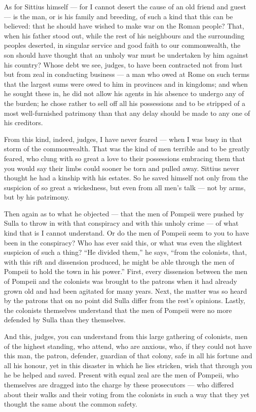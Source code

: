  As for Sittius himself --- for I cannot desert the cause of an old friend and guest --- is the man, or is his family and breeding, of such a kind that this can be believed: that he should have wished to make war on the Roman people? That, when his father stood out, while the rest of his neighbours and the surrounding peoples deserted, in singular service and good faith to our commonwealth, the son should have thought that an unholy war must be undertaken by him against his country? Whose debt we see, judges, to have been contracted not from lust but from zeal in conducting business --- a man who owed at Rome on such terms that the largest sums were owed to him in provinces and in kingdoms; and when he sought these in, he did not allow his agents in his absence to undergo any of the burden; he chose rather to sell off all his possessions and to be stripped of a most well-furnished patrimony than that any delay should be made to any one of his creditors.

 From this kind, indeed, judges, I have never feared --- when I was busy in that storm of the commonwealth. That was the kind of men terrible and to be greatly feared, who clung with so great a love to their possessions embracing them that you would say their limbs could sooner be torn and pulled away. Sittius never thought he had a kinship with his estates. So he saved himself not only from the suspicion of so great a wickedness, but even from all men's talk --- not by arms, but by his patrimony.

 Then again as to what he objected --- that the men of Pompeii were pushed by Sulla to throw in with that conspiracy and with this unholy crime --- of what kind that is I cannot understand. Or do the men of Pompeii seem to you to have been in the conspiracy? Who has ever said this, or what was even the slightest suspicion of such a thing? ``He divided them,'' he says, ``from the colonists, that, with this rift and dissension produced, he might be able through the men of Pompeii to hold the town in his power.'' First, every dissension between the men of Pompeii and the colonists was brought to the patrons when it had already grown old and had been agitated for many years. Next, the matter was so heard by the patrons that on no point did Sulla differ from the rest's opinions. Lastly, the colonists themselves understand that the men of Pompeii were no more defended by Sulla than they themselves.

 And this, judges, you can understand from this large gathering of colonists, men of the highest standing, who attend, who are anxious, who, if they could not have this man, the patron, defender, guardian of that colony, safe in all his fortune and all his honour, yet in this disaster in which he lies stricken, wish that through you he be helped and saved. Present with equal zeal are the men of Pompeii, who themselves are dragged into the charge by these prosecutors --- who differed about their walks and their voting from the colonists in such a way that they yet thought the same about the common safety.

